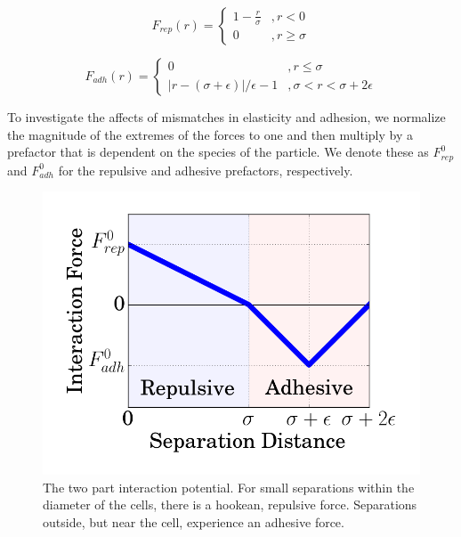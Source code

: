 \documentclass[aps,prb,twocolumn,groupedaddress,nofootinbib,floatfix]{revtex4}
\begin{document}
\begin{equation}
  F_{rep}(r) = \left\{
    \begin{array}{lr}
      1-\frac{r}{\sigma} &, r < 0\\
      0 &, r \ge \sigma
    \end{array}
  \right.
  \label{eq:frep}
\end{equation}

\begin{equation}
  F_{adh}(r) = \left\{
    \begin{array}{lr}
      0 &, r \le \sigma \\
      |r - (\sigma+\epsilon)|/\epsilon-1 &, \sigma < r < \sigma+2\epsilon
    \end{array}
  \right.
  \label{eq:fadh}
\end{equation}

To investigate the affects of mismatches in elasticity and adhesion, we normalize the magnitude of the extremes of the forces to one and then multiply by a prefactor that is dependent on the species of the particle. We denote these as $F^0_{rep}$ and $F^0_{adh}$ for the repulsive and adhesive prefactors, respectively.

\begin{figure}
  \includegraphics[width=1.0\columnwidth]{interaction.png}
  \caption[capsuleECM]{The two part interaction potential. For small separations
    within the diameter of the cells, there is a hookean, repulsive force. Separations
    outside, but near the cell, experience an adhesive force.}
   \label{fig:interaction}
\end{figure}
\end{document}
